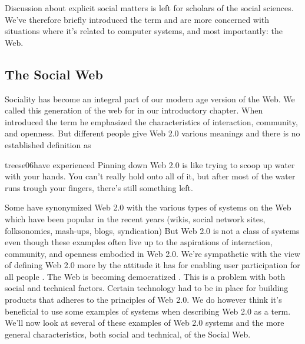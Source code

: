 Discussion about explicit social matters is left for scholars of the social
sciences. We've therefore briefly introduced the term and are more concerned
with situations where it's related to computer systems, and most importantly:
the Web.

\subsection{The Social Web}
\label{section:background.sociality.the.social.web}

Sociality has become an integral part of our modern age version of the Web.
We called this generation of the web for %
in our introductory chapter. When \citet{oreilly05} introduced the term he
emphasized the characteristics of interaction, community, and openness.
But different people give Web 2.0 various meanings and there is no
established definition as
\begin{fullquote}[\p{15}]{treese06}{have experienced}
  Pinning down Web 2.0 is like trying to scoop up water with your hands. You
  can't really hold onto all of it, but after most of the water runs trough
  your fingers, there's still something left.
\end{fullquote}

Some have synonymized Web 2.0 with the various types of systems on the
Web which have been popular in the recent years
(wikis, social network sites, folksonomies, mash-ups, blogs, syndication)
But Web 2.0 is not a class of systems \citep[]{millard06} even though
these examples often live up to the aspirations of interaction, community,
and openness embodied in Web 2.0. We're sympathetic with the view of defining
Web 2.0 more by the attitude it has for enabling user participation for all
people \citep[]{lin07}. The Web is becoming democratized
\citep{graham05}. This is a problem with both social and
technical factors. Certain technology had to be in place for building
products that adheres to the principles of Web 2.0. We do however think it's
beneficial to use some examples of systems when describing Web 2.0 as a term.
We'll now look at several of these examples of Web 2.0 systems and
the more general characteristics, both social and technical,
of the Social Web.

